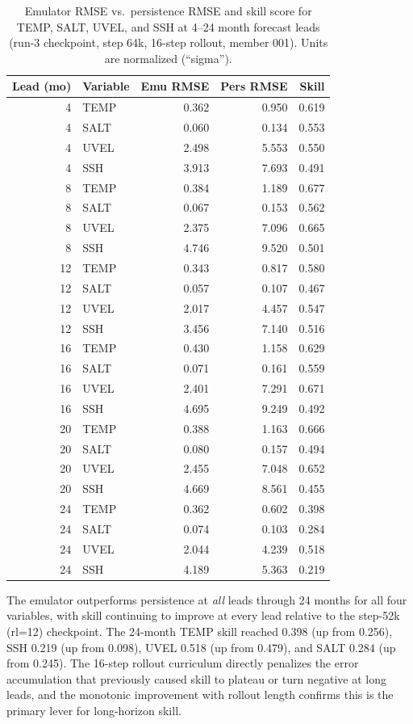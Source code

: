 \documentclass[11pt]{article}
\begin{document}
\begin{table}[h]
\centering
\caption{Emulator RMSE vs.\ persistence RMSE and skill score for TEMP, SALT, UVEL,
and SSH at 4--24 month forecast leads (run-3 checkpoint, step 64k, 16-step rollout,
member 001). Units are normalized (``sigma'').}
\label{tab:skill}
\begin{tabular}{rlrrr}
\toprule
Lead (mo) & Variable & Emu RMSE & Pers RMSE & Skill \\
\midrule
 4 & TEMP & 0.362 & 0.950 & 0.619 \\
 4 & SALT & 0.060 & 0.134 & 0.553 \\
 4 & UVEL & 2.498 & 5.553 & 0.550 \\
 4 & SSH  & 3.913 & 7.693 & 0.491 \\
\midrule
 8 & TEMP & 0.384 & 1.189 & 0.677 \\
 8 & SALT & 0.067 & 0.153 & 0.562 \\
 8 & UVEL & 2.375 & 7.096 & 0.665 \\
 8 & SSH  & 4.746 & 9.520 & 0.501 \\
\midrule
12 & TEMP & 0.343 & 0.817 & 0.580 \\
12 & SALT & 0.057 & 0.107 & 0.467 \\
12 & UVEL & 2.017 & 4.457 & 0.547 \\
12 & SSH  & 3.456 & 7.140 & 0.516 \\
\midrule
16 & TEMP & 0.430 & 1.158 & 0.629 \\
16 & SALT & 0.071 & 0.161 & 0.559 \\
16 & UVEL & 2.401 & 7.291 & 0.671 \\
16 & SSH  & 4.695 & 9.249 & 0.492 \\
\midrule
20 & TEMP & 0.388 & 1.163 & 0.666 \\
20 & SALT & 0.080 & 0.157 & 0.494 \\
20 & UVEL & 2.455 & 7.048 & 0.652 \\
20 & SSH  & 4.669 & 8.561 & 0.455 \\
\midrule
24 & TEMP & 0.362 & 0.602 & 0.398 \\
24 & SALT & 0.074 & 0.103 & 0.284 \\
24 & UVEL & 2.044 & 4.239 & 0.518 \\
24 & SSH  & 4.189 & 5.363 & 0.219 \\
\bottomrule
\end{tabular}
\end{table}

The emulator outperforms persistence at \emph{all} leads through 24 months for
all four variables, with skill continuing to improve at every lead relative to
the step-52k (rl=12) checkpoint. The 24-month TEMP skill reached 0.398 (up from
0.256), SSH 0.219 (up from 0.098), UVEL 0.518 (up from 0.479), and SALT 0.284
(up from 0.245). The 16-step rollout curriculum directly penalizes the error
accumulation that previously caused skill to plateau or turn negative at long
leads, and the monotonic improvement with rollout length confirms this is the
primary lever for long-horizon skill.
\end{document}
